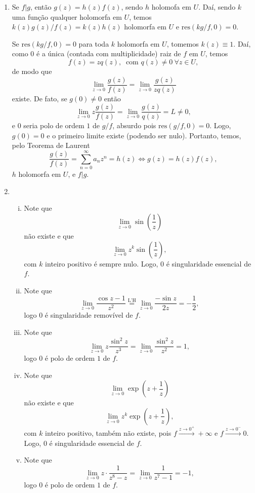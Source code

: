 \documentclass[12pt,a4paper]{article}
\newcommand{\res}{\mathrm{res}}
\begin{document}
\begin{enumerate}
		\item Se $f|g$, então $g(z) = h(z)f(z)$, sendo $h$ holomofa em $U$. Daí, sendo $k$ uma função qualquer holomorfa em $U$, temos $k(z)g(z)/f(z) = k(z)h(z)$ holomorfa em $U$ e $\res(kg/f,0) = 0$.
		
		Se $\res(kg/f,0) = 0$ para toda $k$ holomorfa em $U$, tomemos $k(z)\equiv 1$. Daí, como $0$ é a única (contada com multiplicidade) raiz de $f$ em $U$, temos
		$$
		f(z) = zq(z), \ \text{ com } q(z)\neq 0 \ \forall z\in U,
		$$ 
		de modo que 
		$$
		\lim\limits_{z\to 0}\frac{g(z)}{f(z)} = \lim\limits_{z\to 0} \frac{g(z)}{zq(z)}
		$$
		existe. De fato, se $g(0)\neq 0$ então
		$$
		\lim\limits_{z\to 0} z\frac{g(z)}{f(z)} = \lim\limits_{z\to 0}\frac{g(z)}{q(z)} = L\neq 0,
		$$
		e $0$ seria polo de ordem $1$ de $g/f$, absurdo pois $\res(g/f,0) = 0$. Logo, $g(0) = 0$ e o primeiro limite existe (podendo ser nulo). Portanto, temos, pelo Teorema de Laurent
		$$
		\frac{g(z)}{f(z)} = \sum_{n=0}^{\infty}a_nz^n = h(z) \iff g(z) = h(z)f(z),
		$$
		$h$ holomorfa em $U$, e $f|g$.
		
		\item\begin{enumerate}[(i)]
			\item Note que
			$$
			\lim\limits_{z\to 0} \sin\left(\frac{1}{z}\right)
			$$
			não existe e que 
			$$
			\lim\limits_{z\to 0} z^k\sin\left(\frac{1}{z}\right),
			$$
			com $k$ inteiro positivo é sempre nulo. Logo, $0$ é singularidade essencial de $f$.
			
			\item Note que
			$$
			\lim\limits_{z\to 0}\frac{\cos z - 1}{z^2} \stackrel{\text{L'H}}{=} \lim\limits_{z\to 0}\frac{-\sin z}{2z} = -\frac{1}{2},
			$$
			logo $0$ é singularidade removível de $f$.
			
			\item Note que
			$$
			\lim\limits_{z\to 0}z\frac{\sin^2 z}{z^3} = \lim\limits_{z\to 0}\frac{\sin^2 z}{z^2} = 1,
			$$
			logo $0$ é polo de ordem $1$ de $f$.
			
			\item Note que
			$$
			\lim\limits_{z\to 0}\exp\left(z+\frac{1}{z}\right)
			$$
			não existe e que
			$$
			\lim\limits_{z\to 0}z^k\exp\left(z+\frac{1}{z}\right),
			$$
			com $k$ inteiro positivo, também não existe, pois $f\xrightarrow{z\to 0^+}+\infty$ e $f\xrightarrow{z\to 0^-} 0$. Logo, $0$ é singularidade essencial de $f$.
			
			\item Note que
			$$
			\lim\limits_{z\to 0}z\cdot\frac{1}{z^8 - z} = \lim\limits_{z\to 0}\frac{1}{z^7-1} = -1,
			$$
			logo $0$ é polo de ordem $1$ de $f$.
			

\end{enumerate}
\end{enumerate}
\end{document}
